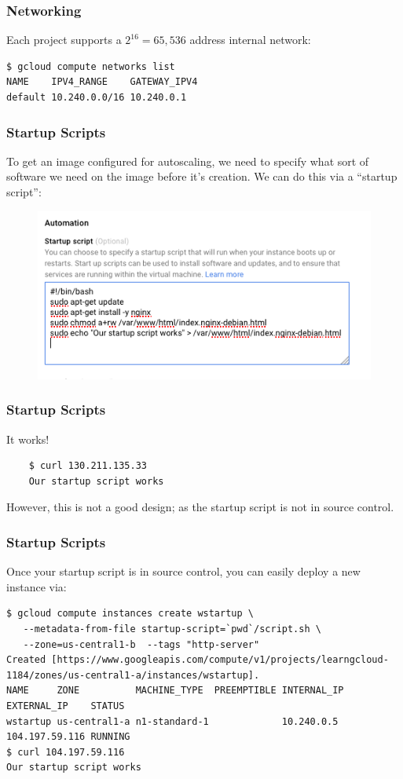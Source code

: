 \documentclass[9pt]{beamer}
\begin{document}
\begin{frame}[fragile]
  \frametitle{Networking}
  Each project supports a $2^{16} = 65,536$ address internal network:
  \begin{verbatim}
$ gcloud compute networks list
NAME    IPV4_RANGE    GATEWAY_IPV4
default 10.240.0.0/16 10.240.0.1    
  \end{verbatim}
\end{frame}

\begin{frame}[fragile]
  \frametitle{Startup Scripts}
  To get an image configured for autoscaling, we need to specify what sort of software we need on the image before it's creation. We can do this via a ``startup script'':
  \begin{figure}
    \includegraphics[scale=0.3]{figures/StartupScript.png}
  \end{figure}
\end{frame}

\begin{frame}[fragile]
	\frametitle{Startup Scripts}
	It works!
	\begin{verbatim}
	$ curl 130.211.135.33
	Our startup script works
	\end{verbatim}
	However, this is not a good design; as the startup script is not in source control.
\end{frame}

\begin{frame}[fragile]
	\frametitle{Startup Scripts}
	Once your startup script is in source control, you can easily deploy a new instance via:
\begin{verbatim}
$ gcloud compute instances create wstartup \
   --metadata-from-file startup-script=`pwd`/script.sh \
   --zone=us-central1-b  --tags "http-server"
Created [https://www.googleapis.com/compute/v1/projects/learngcloud-1184/zones/us-central1-a/instances/wstartup].
NAME     ZONE          MACHINE_TYPE  PREEMPTIBLE INTERNAL_IP EXTERNAL_IP    STATUS
wstartup us-central1-a n1-standard-1             10.240.0.5  104.197.59.116 RUNNING
$ curl 104.197.59.116
Our startup script works
\end{verbatim}
\end{frame}
\end{document}
